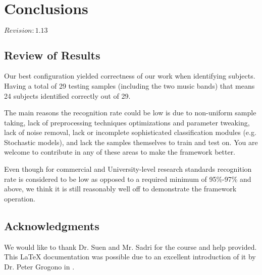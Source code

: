 \chapter{Conclusions}

$Revision: 1.13 $

\section{Review of Results}

Our best configuration yielded \bestscore{} correctness
of our work when identifying subjects. Having a total
of 29 testing samples (including the two music bands) that means
24 subjects identified correctly out of 29.

The main reasons the recognition rate could be low
is due to non-uniform sample taking, lack of preprocessing
techniques optimizations and parameter tweaking, lack of noise removal, lack or incomplete
sophisticated classification modules (e.g. Stochastic models),
and lack the samples themselves to train and test on.
You are welcome to contribute in any of these areas to make the framework better.

Even though for commercial and University-level research
standards \bestscore{} recognition rate is considered to be
low as opposed to a required minimum of 95\%-97\% and above,
we think it is still reasonably well off
to demonstrate the framework operation.

\section{Acknowledgments}

We would like to thank Dr. Suen and Mr. Sadri
for the course and help provided.
This {\LaTeX} documentation was possible due to an
excellent introduction of it by Dr. Peter Grogono
in \cite{grogono2001}.

